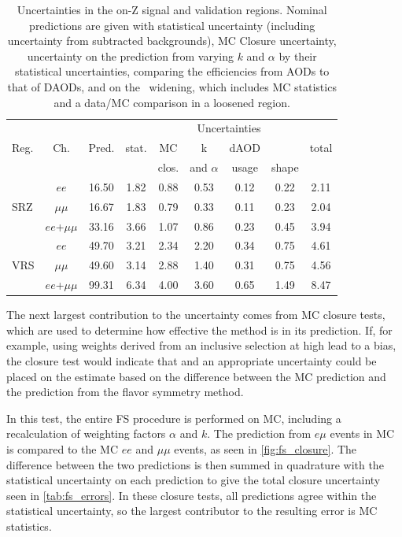 \begin{table}[!ht]
\begin{center}
 \begin{tabular}{lcc|cccccc}
 \hline 
 \multirow{3}{*}{Reg.}	& \multirow{3}{*}{Ch.} 	& \multirow{3}{*}{Pred.} & \multicolumn{6}{c}{Uncertainties} \\
   \cline{4-9} 
   		 	& 		 	& 	  		& stat.  		& MC 		& k  			& dAOD 		& \mll  	& total \\
   			& 			& 		 	& 			 	& clos. 	& and $\alpha$	& usage	 	& shape  	& \\
   \hline
   \hline
\multirow{3}{*}{SRZ}
& $ee$ & 16.50 & 1.82 & 0.88 & 0.53 & 0.12 & 0.22 & 2.11 \\ 
& $\mu\mu$ & 16.67 & 1.83 & 0.79 & 0.33 & 0.11 & 0.23 & 2.04 \\ 
& $ee$+$\mu\mu$ & 33.16 & 3.66 & 1.07 & 0.86 & 0.23 & 0.45 & 3.94 \\ 
\hline
\multirow{3}{*}{VRS}
& $ee$ & 49.70 & 3.21 & 2.34 & 2.20 & 0.34 & 0.75 & 4.61 \\ 
& $\mu\mu$ & 49.60 & 3.14 & 2.88 & 1.40 & 0.31 & 0.75 & 4.56 \\ 
& $ee$+$\mu\mu$ & 99.31 & 6.34 & 4.00 & 3.60 & 0.65 & 1.49 & 8.47 \\ 
\hline
 
\hline
\hline
 \end{tabular}
\end{center}
 \caption{
   Uncertainties in the on-Z signal and validation regions. Nominal predictions are given with statistical uncertainty (including uncertainty from subtracted backgrounds), MC Closure uncertainty, uncertainty on the prediction from varying $k$ and $\alpha$ by their statistical uncertainties, comparing the efficiencies from AODs to that of DAODs, and on the \mll~widening, which includes MC statistics and a data/MC comparison in a loosened region.
 }
 \label{tab:fs_errors}
\end{table}

The next largest contribution to the uncertainty comes from \ac{MC} closure tests, which are used to determine how effective the method is in its prediction. If, for example, using weights derived from an inclusive selection at high \met lead to a bias, the closure test would indicate that and an appropriate uncertainty could be placed on the estimate based on the difference between the \ac{MC} prediction and the prediction from the flavor symmetry method. 

In this test, the entire \ac{FS} procedure is performed on \ttbar \ac{MC}, including a recalculation of weighting factors $\alpha$ and $k$. The prediction from $e\mu$ events in \ac{MC} is compared to the \ac{MC} $ee$ and $\mu\mu$ events, as seen in \autoref{fig:fs_closure}. The difference between the two predictions is then summed in quadrature with the statistical uncertainty on each prediction to give the total closure uncertainty seen in \autoref{tab:fs_errors}. In these closure tests, all predictions agree within the statistical uncertainty, so the largest contributor to the resulting error is \ac{MC} statistics. 

